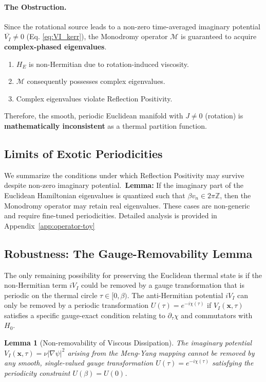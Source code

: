 \documentclass[11pt]{article}
\newtheorem{lemma}{Lemma}
\begin{document}
\paragraph{The Obstruction.}
Since the rotational source leads to a non-zero time-averaged imaginary potential $\overline{V_I} \neq 0$ (Eq. \ref{eq:VI_kerr}), the Monodromy operator $\mathcal{M}$ is guaranteed to acquire \textbf{complex-phased eigenvalues}.

\begin{enumerate}
    \item $H_E$ is non-Hermitian due to rotation-induced viscosity.
    \item $\mathcal{M}$ consequently possesses complex eigenvalues.
    \item Complex eigenvalues violate Reflection Positivity\cite{OsterwalderSchrader1973}.
\end{enumerate}
Therefore, the smooth, periodic Euclidean manifold with $J \neq 0$ (rotation) is \textbf{mathematically inconsistent} as a thermal partition function.

\subsection{Limits of Exotic Periodicities}\label{sec:exotic_periodicities}
We summarize the conditions under which Reflection Positivity may survive despite non-zero imaginary potential.\
\textbf{Lemma:} If the imaginary part of the Euclidean Hamiltonian eigenvalues is quantized such that $\beta v_n \in 2\pi\mathbb{Z}$, then the Monodromy operator may retain real eigenvalues.
These cases are non-generic and require fine-tuned periodicities. Detailed analysis is provided in Appendix~\ref{app:operator-toy}
\subsection{Robustness: The Gauge-Removability Lemma}
\label{subsec:gauge-removability}

The only remaining possibility for preserving the Euclidean thermal state is if the non-Hermitian term $iV_I$ could be removed by a gauge transformation that is periodic on the thermal circle $\tau \in [0, \beta)$.
The anti-Hermitian potential $iV_I$ can only be removed by a periodic transformation $U(\tau)=e^{-i\chi(\tau)}$ if $V_I(\mathbf{x}, \tau)$ satisfies a specific gauge-exact condition relating to $\partial_\tau\chi$ and commutators with $H_0$.

\begin{lemma}[Non-removability of Viscous Dissipation]\label{lem:gauge-removability}
The imaginary potential $V_I(\mathbf{x},\tau) = \nu|\nabla\psi|^2$ arising from the Meng-Yang mapping
cannot be removed by any smooth, single-valued gauge transformation $U(\tau) = e^{-i\chi(\tau)}$
satisfying the periodicity constraint $U(\beta) = U(0)$.
\end{lemma}
\end{document}
